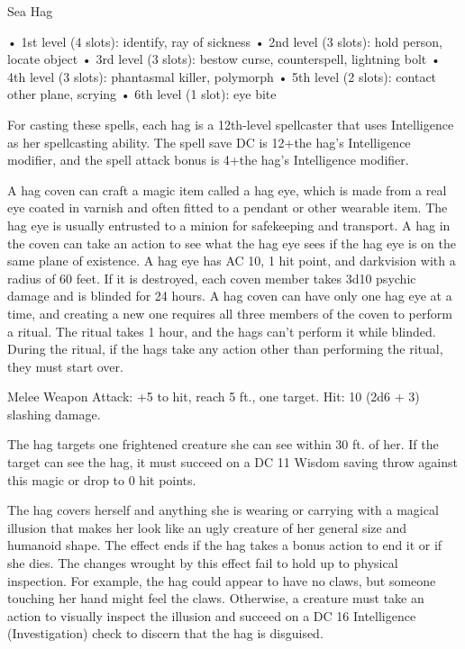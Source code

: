 \begin{monsterbox}{Sea Hag}
\begin{monsteraction}
• 1st level (4 slots): identify, ray of sickness
• 2nd level (3 slots): hold person, locate object
• 3rd level (3 slots): bestow curse, counterspell, lightning bolt
• 4th level (3 slots): phantasmal killer, polymorph
• 5th level (2 slots): contact other plane, scrying
• 6th level (1 slot): eye bite

For casting these spells, each hag is a 12th-level spellcaster that uses Intelligence as her spellcasting ability. The spell save DC is 12+the hag's Intelligence modifier, and the spell attack bonus is 4+the hag's Intelligence modifier.
\end{monsteraction}
\begin{monsteraction}
A hag coven can craft a magic item called a hag eye, which is made from a real eye coated in varnish and often fitted to a pendant or other wearable item. The hag eye is usually entrusted to a minion for safekeeping and transport. A hag in the coven can take an action to see what the hag eye sees if the hag eye is on the same plane of existence. A hag eye has AC 10, 1 hit point, and darkvision with a radius of 60 feet. If it is destroyed, each coven member takes 3d10 psychic damage and is blinded for 24 hours.
A hag coven can have only one hag eye at a time, and creating a new one requires all three members of the coven to perform a ritual. The ritual takes 1 hour, and the hags can't perform it while blinded. During the ritual, if the hags take any action other than performing the ritual, they must start over.
\end{monsteraction}
\begin{monsteraction}[Claws]
Melee Weapon Attack: +5 to hit, reach 5 ft., one target. Hit: 10 (2d6 + 3) slashing damage.
\end{monsteraction}
\begin{monsteraction}
The hag targets one frightened creature she can see within 30 ft. of her. If the target can see the hag, it must succeed on a DC 11 Wisdom saving throw against this magic or drop to 0 hit points.
\end{monsteraction}
\begin{monsteraction}
The hag covers herself and anything she is wearing or carrying with a magical illusion that makes her look like an ugly creature of her general size and humanoid shape. The effect ends if the hag takes a bonus action to end it or if she dies.
The changes wrought by this effect fail to hold up to physical inspection. For example, the hag could appear to have no claws, but someone touching her hand might feel the claws. Otherwise, a creature must take an action to visually inspect the illusion and succeed on a DC 16 Intelligence (Investigation) check to discern that the hag is disguised.
\end{monsteraction}
\end{monsterbox}